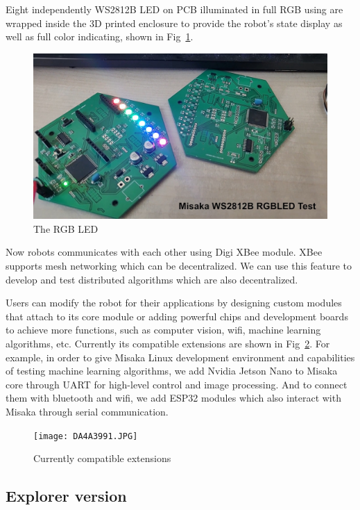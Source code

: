 \documentclass[sigconf]{acmart}
\begin{document}
Eight independently WS2812B LED on PCB illuminated in full RGB using are wrapped inside the 3D printed enclosure to provide the robot’s state display as well as full color indicating, shown in Fig~\ref{fig:RGB}.

\begin{figure}[h]
  \centering
  \includegraphics[width=\linewidth]{RGB.jpg}
  \caption{The RGB LED}
  \label{fig:RGB}
\end{figure}

Now robots communicates with each other using Digi XBee module. XBee supports mesh networking which can be decentralized. We can use this feature to develop and test distributed algorithms which are also decentralized.

Users can modify the robot for their applications by designing custom modules that attach to its core module or adding powerful chips and development boards to achieve more functions, such as computer vision, wifi, machine learning algorithms, etc. Currently its compatible extensions are shown in Fig~\ref{fig:extensions}. For example, in order to give Misaka Linux development environment and capabilities of testing machine learning algorithms, we add Nvidia Jetson Nano to Misaka core through UART for high-level control and image processing. And to connect them with bluetooth and wifi, we add ESP32 modules which also interact with Misaka through serial communication.\cite{zhang2020misaka}

\begin{figure}[h]
  \centering
  \texttt{[image: DA4A3991.JPG]}
  \caption{Currently compatible extensions}
  \label{fig:extensions}
\end{figure}

\subsection{Explorer version}
\end{document}

